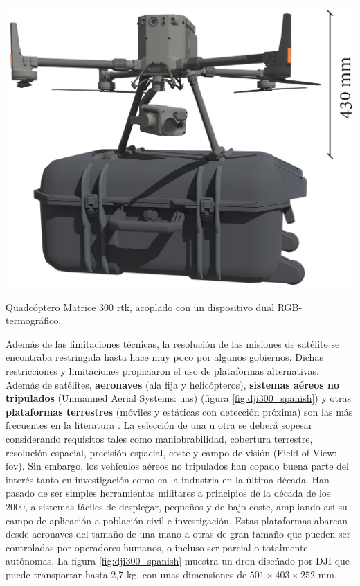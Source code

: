 \begin{marginfigure}[.7cm]
	\includegraphics{figs/introduction/dji300.png}
	\caption{Quadcóptero Matrice 300 \acrshort{rtk}, acoplado con un dispositivo dual RGB-termográfico. }
	\label{fig:dji300_spanish}
\end{marginfigure}
Además de las limitaciones técnicas, la resolución de las misiones de satélite se encontraba restringida hasta hace muy poco por algunos gobiernos. Dichas restricciones y limitaciones propiciaron el uso de plataformas alternativas. Además de satélites, \textbf{aeronaves} (ala fija y helicópteros), \textbf{sistemas aéreos no tripulados} (Unmanned Aerial Systems: \acrshort{uas}) (figura \ref{fig:dji300_spanish}) y otras \textbf{plataformas terrestres} (móviles y estáticas con detección próxima) son las más frecuentes en la literatura \cite{lillesand_remote_2015}. La selección de una u otra se deberá sopesar considerando requisitos tales como maniobrabilidad, cobertura terrestre, resolución espacial, precisión espacial, coste y campo de visión (Field of View: \acrshort{fov}). Sin embargo, los vehículos aéreos no tripulados han copado buena parte del interés tanto en investigación como en la industria en la última década. Han pasado de ser simples herramientas militares a principios de la década de los 2000, a sistemas fáciles de desplegar, pequeños y de bajo coste, ampliando así su campo de aplicación a población civil e investigación. Estas plataformas abarcan desde aeronaves del tamaño de una mano a otras de gran tamaño que pueden ser controladas por operadores humanos, o incluso ser parcial o totalmente autónomas. La figura \ref{fig:dji300_spanish} muestra un dron diseñado por DJI que puede transportar hasta 2,7 \si{\kilo\gram}, con unas dimensiones de $501 \times 403 \times 252$ \si{\milli\meter}.

